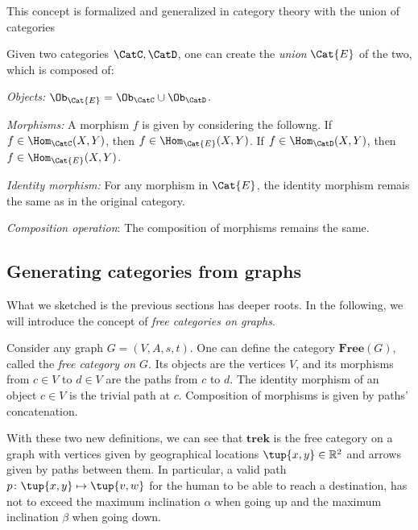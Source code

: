 \noindent This concept is formalized and generalized in category theory with the union of categories
\begin{shaded}
\begin{definition}
Given two categories $\CatC,\CatD$, one can create the \emph{union} $\Cat{E}$ of the two, which is composed of:
\begin{compactenum}
\item \emph{Objects:} $\Ob_\Cat{E}=\Ob_\CatC \cup \Ob_\CatD$.
\item \emph{Morphisms:} A morphism $f$ is given by considering the followng. If $f\in \Hom_\CatC(X,Y)$, then $f\in \Hom_\Cat{E}(X,Y)$. If $f\in \Hom_\CatD(X,Y)$, then $f\in \Hom_\Cat{E}(X,Y)$.
\item \emph{Identity morphism:} For any morphism in $\Cat{E}$, the identity morphism remais the same as in the original category.
\item \emph{Composition operation}: The composition of morphisms remains the same.
\end{compactenum}
\end{definition}
\end{shaded}

\subsection{Generating categories from graphs}
What we sketched is the previous sections has deeper roots. In the following, we will introduce the concept of \emph{free categories on graphs}.

\begin{shaded}
\begin{definition}
Consider any graph $G=(V,A,s,t)$. One can define the category $\mathbf{Free}(G)$, called the \emph{free category on $G$}. Its objects are the vertices $V$, and its morphisms from $c\in V$ to $d\in V$ are the paths from $c$ to $d$. The identity morphism of an object $c\in V$ is the trivial path at $c$. Composition of morphisms is given by paths' concatenation.
\end{definition}
\end{shaded}


With these two new definitions, we can see that $\mathbf{trek}$ is the free category on a graph with vertices given by geographical locations $\tup{x,y}\in \mathbb{R}^2$ and arrows given by paths between them. In particular, a valid path $p\colon \tup{x,y}\mapsto \tup{v,w}$ for the human to be able to reach a destination, has not to exceed the maximum inclination $\alpha$ when going up and the maximum inclination $\beta$ when going down.

